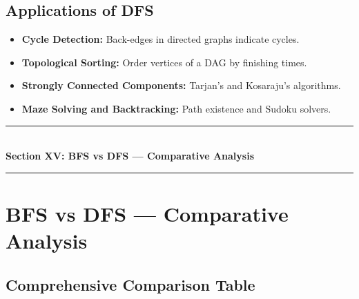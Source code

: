 \subsection{Applications of DFS}
\begin{itemize}
    \item \textbf{Cycle Detection:} Back-edges in directed graphs indicate cycles.
    \item \textbf{Topological Sorting:} Order vertices of a DAG by finishing times.
    \item \textbf{Strongly Connected Components:} Tarjan's and Kosaraju's algorithms.
    \item \textbf{Maze Solving and Backtracking:} Path existence and Sudoku solvers.
\end{itemize}

\newpage
\begin{center}
\vspace{0.5em}
{\color{primary}\rule{0.45\textwidth}{1.2pt}}\\[4pt]
{\Large\bfseries\color{primary} Section XV: BFS vs DFS --- Comparative Analysis}\\[2pt]
{\color{primary}\rule{0.45\textwidth}{1.2pt}}
\vspace{0.5em}
\end{center}

\section{BFS vs DFS --- Comparative Analysis}

\subsection{Comprehensive Comparison Table}


